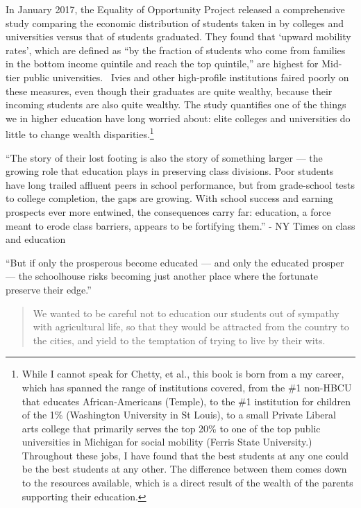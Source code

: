 In January 2017, the Equality of Opportunity Project released a comprehensive study comparing the economic distribution of students taken in by colleges and universities versus that of students graduated. They found that `upward mobility rates', which are defined as ``by the fraction of students who come from families in the bottom income quintile and reach the top quintile,'' are highest for Mid-tier public universities.~\citep{Chetty:2017wv} Ivies and other high-profile institutions faired poorly on these measures, even though their graduates are quite wealthy, because their incoming students are also quite wealthy. The study quantifies one of the things we in higher education have long worried about: elite colleges and universities do little to change wealth disparities.\footnote{While I cannot speak for Chetty, et al., this book is born from a my career, which has spanned the range of institutions covered, from the \#1 non-HBCU that educates African-Americans (Temple), to the \#1 institution for children of the 1\% (Washington University in St Louis), to a small Private Liberal arts college that primarily serves the top 20\% to one of the top public universities in Michigan for social mobility (Ferris State University.) Throughout these jobs, I have found that the best students at any one could be the best students at any other. The difference between them comes down to the resources available, which is a direct result of the wealth of the parents supporting their education.}

``The story of their lost footing is also the story of something larger --- the growing role that education plays in preserving class divisions. Poor students have long trailed affluent peers in school performance, but from grade-school tests to college completion, the gaps are growing. With school success and earning prospects ever more entwined, the consequences carry far: education, a force meant to erode class barriers, appears to be fortifying them.'' - NY Times on class and education

``But if only the prosperous become educated --- and only the educated prosper --- the schoolhouse risks becoming just another place where the fortunate preserve their edge.''

\begin{quote}

We wanted to be careful not to education our students out of sympathy with agricultural life, so that they would be attracted from the country to the cities, and yield to the temptation of trying to live by their wits. ~\citep[p. 74]{Washington:1952uf}
\end{quote}

